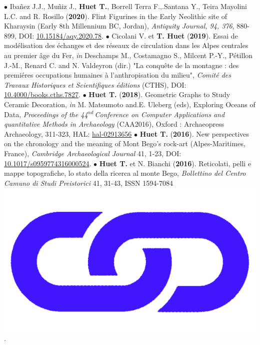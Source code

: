 \documentclass{article}
\begin{document}
\smallbreak
$\bullet$ Iba\~{n}ez J.J., Mu\~{n}iz J., \textbf{Huet T.}, Borrell Terra F.,.Santana Y., Teira Mayolini L.C. and R. Rosillo (\textbf{2020}). Flint Figurines in the Early Neolithic site of Kharaysin (Early 8th Millennium BC, Jordan), \textit{Antiquity Journal, 94, 376}, 880-899, DOI: \href{https://doi.org/10.15184/aqy.2020.78}{10.15184/aqy.2020.78}.
\smallbreak
$\bullet$ Cicolani V. et \textbf{T. Huet} (\textbf{2019}). Essai de mod\'{e}lisation des \'{e}changes et des r\'{e}seaux de circulation dans les Alpes centrales au premier \^{a}ge du Fer, \textit{in} Deschamps M., Costamagno S., Milcent P.-Y., Pétillon J.-M., Renard C. and N. Valdeyron (dir.) "La conqu\^{e}te de la montagne : des premi\'{e}res occupations humaines \`{a} l'anthropisation du milieu", \textit{Comit\'{e} des Travaux Historiques et Scientifiques \'{e}ditions} (CTHS), DOI: \href{https://books.openedition.org/cths/7827}{10.4000/books.cths.7827}.
\smallbreak
$\bullet$ \textbf{Huet T.} (\textbf{2018}). Geometric Graphs to Study Ceramic Decoration, \textit{in} M. Matsumoto and.E. Uleberg (eds), Exploring Oceans of Data, \textit{Proceedings of the 44${}^{nd\ }$Conference on Computer Applications and quantitative Methods in Archaeology} (CAA2016), Oxford : Archaeopress Archaeology, 311-323, HAL: \href{https://hal.archives-ouvertes.fr/hal-02913656}{hal-02913656}
\smallbreak
$\bullet$ \textbf{Huet T.} (\textbf{2016}). New perspectives on the chronology and the meaning of Mont Bego's rock-art (Alpes-Maritimes, France), \textit{Cambridge Archaeological Journal} 41, 1-23, DOI: \href{https://doi.org/10.1017/s0959774316000524}{10.1017/s0959774316000524}.
\smallbreak
$\bullet$ \textbf{Huet T.} et N. Bianchi (\textbf{2016}). Reticolati, pelli e mappe topografiche, lo stato della ricerca al monte Bego, \textit{Bollettino del Centro Camuno di Studi Preistorici} 41, 31-43, ISSN 1594-7084 \href{http://www.ccsp.it/web/infoccsp/bcsp/bcsp41_preview.pdf}{\includegraphics[scale=0.015]{link_darkblue.png}}.
\end{document}
